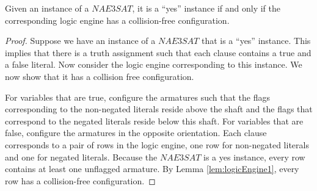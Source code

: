 \begin{thm}\label{thm:Satisfiability-1}
 Given an instance of a $NAE3SAT$,  it is a ``yes'' instance if and only if the 
corresponding logic engine has a collision-free configuration.
\end{thm}
\begin{proof}
Suppose we have an instance of a $NAE3SAT$ that is a ``yes'' instance. This implies that there is a 
truth assignment such that each clause contains a true and a false literal. Now consider the logic 
engine corresponding to this instance. We now 
show that it has a collision free configuration.

For variables that are true, configure the armatures such that the flags corresponding to the 
non-negated literals reside above the 
shaft and the flags that correspond to the negated literals reside below this shaft.  For variables 
that are false, configure the 
armatures in the opposite orientation.  Each clause corresponds to a pair of rows in 
the logic engine, one row for non-negated literals and one for negated literals.  Because the 
$NAE3SAT$ is a yes instance, every row contains at least one unflagged armature.  
By Lemma \ref{lem:logicEngine1}, every row  has a collision-free configuration.


\end{proof}
